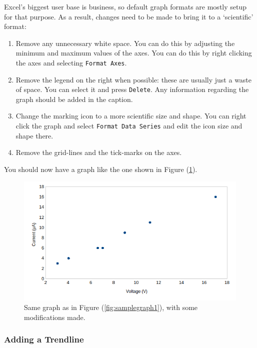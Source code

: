 Excel's biggest user base is business, so default graph formats are mostly setup for that purpose. As a result, changes need to be made to bring it to a `scientific' format: 
\begin{enumerate}
    \item Remove any unnecessary white space. You can do this by adjusting the minimum and maximum values of the axes. You can do this by right clicking the axes and selecting \texttt{Format Axes}.
    
    \item Remove the legend on the right when possible: these are usually just a waste of space. You can select it and press \texttt{Delete}. Any information regarding the graph should be added in the caption.
    
    \item Change the marking icon to a more scientific size and shape. You can right click the graph and select \texttt{Format Data Series} and edit the icon size and shape there.
    
    \item Remove the grid-lines and the tick-marks on the axes.
\end{enumerate}

You should now have a graph like the one shown in Figure (\ref{fig:samplegraph2}).

\begin{figure}[!htb]
    \centering
    \includegraphics[scale=0.8]{figs/samplegraph2.png}
    \caption{Same graph as in Figure (\ref{fig:samplegraph1}), with some modifications made.}
    \label{fig:samplegraph2}
\end{figure}


\subsubsection{Adding a Trendline}


